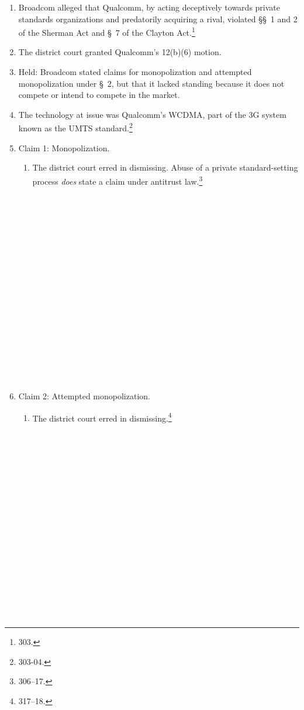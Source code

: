 \begin{enumerate}
    \item Broadcom alleged that Qualcomm, by acting deceptively towards private 
    standards organizations and predatorily acquiring a rival, violated \S\S\ 
    1 and 2 of the Sherman Act and \S\ 7 of the Clayton Act.\footnote{303.}
    \item The district court granted Qualcomm's 12(b)(6) motion.
    \item Held: Broadcom stated claims for monopolization and attempted 
    monopolization under \S\ 2, but that it lacked standing because it does 
    not compete or intend to compete in the market.
    \item The technology at issue was Qualcomm's WCDMA, part of the 3G system 
    known as the UMTS standard.\footnote{303-04.}
    \item Claim 1: Monopolization.
    \begin{enumerate}
        \item The district court erred in dismissing. Abuse of a private 
        standard-setting process \emph{does} state a claim under antitrust 
        law.\footnote{306--17.}
        ~\\\\\\\\\\\\\\\\\\\\\\\\\\\\\\\\\\\\
    \end{enumerate}
    \item Claim 2: Attempted monopolization.
    \begin{enumerate}
        \item The district court erred in dismissing.\footnote{317--18.}
        ~\\\\\\\\\\\\\\\\\\\\\\\\\\\\\\\\\\\\

\end{enumerate}
\end{enumerate}
